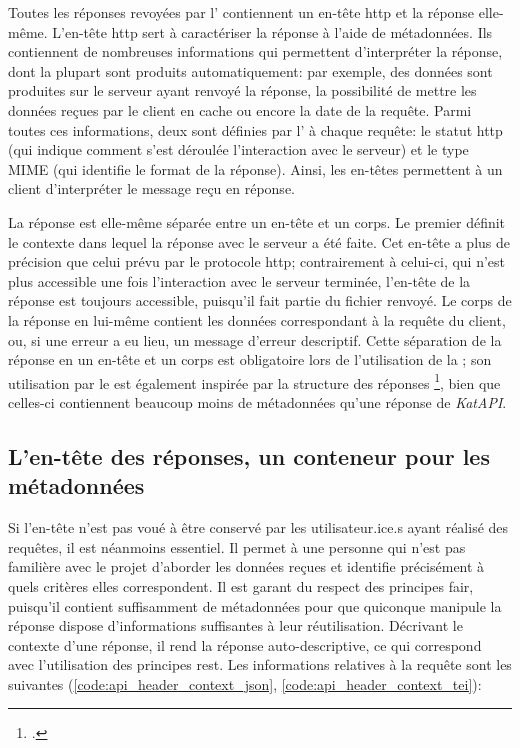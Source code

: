 Toutes les réponses revoyées par l'\api{} contiennent un en-tête \gls{http} et la réponse elle-même. L'en-tête \gls{http} sert à caractériser la réponse à l'aide de métadonnées. Ils contiennent de nombreuses informations qui permettent d'interpréter la réponse, dont la plupart sont produits automatiquement: par exemple, des données sont produites sur le serveur ayant renvoyé la réponse, la possibilité de mettre les données reçues par le client en cache ou encore la date de la requête. Parmi toutes ces informations, deux sont définies par l'\api{} à chaque requête: le statut \gls{http} (qui indique comment s'est déroulée l'interaction avec le serveur) et le type MIME (qui identifie le format de la réponse). Ainsi, les en-têtes permettent à un client d'interpréter le message reçu en réponse.

La réponse est elle-même séparée entre un en-tête et un corps. Le premier définit le contexte dans lequel la réponse avec le serveur a été faite. Cet en-tête a plus de précision que celui prévu par le protocole \gls{http}; contrairement à celui-ci, qui n'est plus accessible une fois l'interaction avec le serveur terminée, l'en-tête de la réponse est toujours accessible, puisqu'il fait partie du fichier renvoyé. Le corps de la réponse en lui-même contient les données correspondant à la requête du client, ou, si une erreur a eu lieu, un message d'erreur descriptif. Cette séparation de la réponse en un en-tête et un corps est obligatoire lors de l'utilisation de la \tei{}; son utilisation par le \json{} est également inspirée par la structure des réponses \sparql{}\footcite{beckett_sparql_2013}, bien que celles-ci contiennent beaucoup moins de métadonnées qu'une réponse de \textit{KatAPI}.

\subsection{L'en-tête des réponses, un conteneur pour les métadonnées}
Si l'en-tête n'est pas voué à être conservé par les utilisateur.ice.s ayant réalisé des requêtes, il est néanmoins essentiel. Il permet à une personne qui n'est pas familière avec le projet d'aborder les données reçues et identifie précisément à quels critères elles correspondent. Il est garant du respect des principes \gls{fair}, puisqu'il contient suffisamment de métadonnées pour que quiconque manipule la réponse dispose d'informations suffisantes à leur réutilisation. Décrivant le contexte d'une réponse, il rend la réponse auto-descriptive, ce qui correspond avec l'utilisation des principes \gls{rest}. Les informations relatives à la requête sont les suivantes (\ref{code:api_header_context_json}, \ref{code:api_header_context_tei}):

